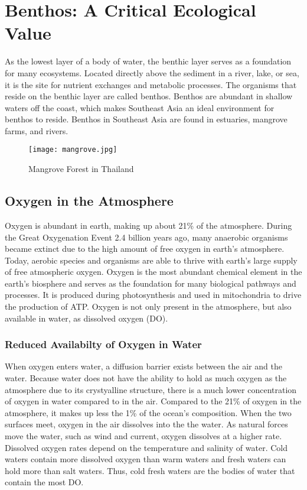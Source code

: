 \section{Benthos: A Critical Ecological Value}

As the lowest layer of a body of water, the benthic layer serves as a foundation for many ecosystems. Located directly above the sediment in a river, lake, or sea, it is the site for nutrient exchanges and metabolic processes. The organisms that reside on the benthic layer are called benthos. Benthos are abundant in shallow waters off the coast, which makes Southeast Asia an ideal environment for benthos to reside. Benthos in Southeast Asia are found in estuaries, mangrove farms, and rivers.

\begin{figure}[!h]
        \centering
        \texttt{[image: mangrove.jpg]}
        \caption{Mangrove Forest in Thailand}
        \label{fig:Benthos Mangroves in Thailand}
\end{figure}

\subsection{Oxygen in the Atmosphere}
Oxygen is abundant in earth, making up about 21\% of the atmosphere. During the Great Oxygenation Event 2.4 billion years ago, many anaerobic organisms became extinct due to the high amount of free oxygen in earth's atmosphere. Today, aerobic species and organisms are able to thrive with earth's large supply of free atmospheric oxygen. Oxygen is the most abundant chemical element in the earth's biosphere and serves as the foundation for many biological pathways and processes. It is produced during photosynthesis and used in mitochondria to drive the production of ATP. Oxygen is not only present in the atmosphere, but also available in water, as dissolved oxygen (DO).

\subsubsection{Reduced Availabilty of Oxygen in Water}
When oxygen enters water, a diffusion barrier exists between the air and the water. Because water does not have the ability to hold as much oxygen as the atmosphere due to its crystyalline structure, there is a much lower concentration of oxygen in water compared to in the air. Compared to the 21\% of oxygen in the atmosphere, it makes up less the 1\% of the ocean's composition. When the two surfaces meet, oxygen in the air dissolves into the the water. As natural forces move the water, such as wind and current, oxygen dissolves at a higher rate. Dissolved oxygen rates depend on the temperature and salinity of water. Cold waters contain more dissolved oxygen than warm waters and fresh waters can hold more than salt waters. Thus, cold fresh waters are the bodies of water that contain the most DO. 

